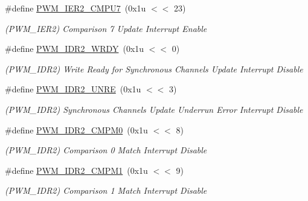 \begin{DoxyCompactItemize}
\mbox{\label{group__SAME70__PWM_ga61e0f7f0a72e26960e25d864347fd490}} 
\#define \mbox{\hyperlink{group__SAME70__PWM_ga61e0f7f0a72e26960e25d864347fd490}{P\+W\+M\+\_\+\+I\+E\+R2\+\_\+\+C\+M\+P\+U7}}~(0x1u $<$$<$ 23)
\begin{DoxyCompactList}\small\item\em (P\+W\+M\+\_\+\+I\+E\+R2) Comparison 7 Update Interrupt Enable \end{DoxyCompactList}\item 
\mbox{\label{group__SAME70__PWM_ga98ee7de3368f975b0eea10fcefb8c2f2}} 
\#define \mbox{\hyperlink{group__SAME70__PWM_ga98ee7de3368f975b0eea10fcefb8c2f2}{P\+W\+M\+\_\+\+I\+D\+R2\+\_\+\+W\+R\+DY}}~(0x1u $<$$<$ 0)
\begin{DoxyCompactList}\small\item\em (P\+W\+M\+\_\+\+I\+D\+R2) Write Ready for Synchronous Channels Update Interrupt Disable \end{DoxyCompactList}\item 
\mbox{\label{group__SAME70__PWM_ga94428564f270df1c0e1605970f49f669}} 
\#define \mbox{\hyperlink{group__SAME70__PWM_ga94428564f270df1c0e1605970f49f669}{P\+W\+M\+\_\+\+I\+D\+R2\+\_\+\+U\+N\+RE}}~(0x1u $<$$<$ 3)
\begin{DoxyCompactList}\small\item\em (P\+W\+M\+\_\+\+I\+D\+R2) Synchronous Channels Update Underrun Error Interrupt Disable \end{DoxyCompactList}\item 
\mbox{\label{group__SAME70__PWM_gab45de8d48554f6be73fd3e08949cea86}} 
\#define \mbox{\hyperlink{group__SAME70__PWM_gab45de8d48554f6be73fd3e08949cea86}{P\+W\+M\+\_\+\+I\+D\+R2\+\_\+\+C\+M\+P\+M0}}~(0x1u $<$$<$ 8)
\begin{DoxyCompactList}\small\item\em (P\+W\+M\+\_\+\+I\+D\+R2) Comparison 0 Match Interrupt Disable \end{DoxyCompactList}\item 
\mbox{\label{group__SAME70__PWM_gac6f97bd578e09de48d19582ba4d00e96}} 
\#define \mbox{\hyperlink{group__SAME70__PWM_gac6f97bd578e09de48d19582ba4d00e96}{P\+W\+M\+\_\+\+I\+D\+R2\+\_\+\+C\+M\+P\+M1}}~(0x1u $<$$<$ 9)
\begin{DoxyCompactList}\small\item\em (P\+W\+M\+\_\+\+I\+D\+R2) Comparison 1 Match Interrupt Disable \end{DoxyCompactList}\item 
$$
\end{DoxyCompactItemize}
